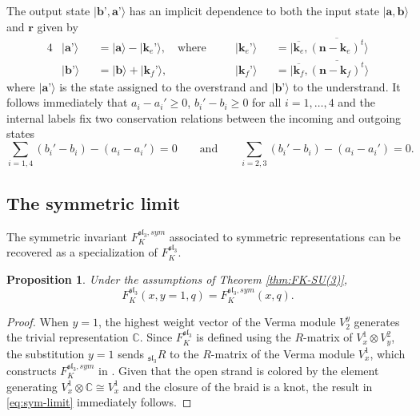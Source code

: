 \documentclass[12pt,oneside,reqno]{amsart}
\def\C{\mathbb{C}}
\newtheorem{proposicion}{\bf Proposition}
\numberwithin{teorema}{section}
\numberwithin{definicion}{section}
\numberwithin{lema}{section}
\numberwithin{conjetura}{section}
\numberwithin{proposicion}{section}
\def\sl{\mathfrak{sl}}
\begin{document}
The output state $|\textbf{b'},\textbf{a'}\rangle$ has an implicit dependence to both the input state $|\textbf{a},\textbf{b}\rangle$ and $\textbf{r}$ given by
\begin{alignat}{4}\label{eq:output-input-1}
    &|\textbf{a'}\rangle &&= |\textbf{a}\rangle - |\textbf{k}_e\textbf{'}\rangle, \hspace{1em} \text{where} \hspace{1em} &&|\textbf{k}_e\textbf{'}\rangle &&= |\overline{\textbf{k}_e},\overline{(\textbf{n}-\textbf{k}_e)^t}\rangle \\ \label{eq:output-input-2}
    &|\textbf{b'}\rangle &&= |\textbf{b}\rangle + |\textbf{k}_f\textbf{'}\rangle, \hspace{2em} &&|\textbf{k}_f\textbf{'}\rangle &&= |\overline{\textbf{k}_f},\overline{(\textbf{n}-\textbf{k}_f)^t}\rangle
\end{alignat}
where $|\textbf{a'}\rangle$ is the state assigned to the overstrand and $|\textbf{b'}\rangle$ to the understrand. It follows immediately that $a_i-a_i'\geq 0$, $b_i'-b_i\geq 0$ for all $i=1,\dots,4$ and the internal labels fix two conservation relations between the incoming and outgoing states
\begin{equation}\label{eq:conservation-rels}
    \sum_{i=1,4} (b_i'-b_i)-(a_i-a_i')=0 \qquad \text{and} \qquad \sum_{i=2,3} (b_i'-b_i)-(a_i-a_i')=0.
\end{equation}

\subsection{The symmetric limit}\label{sec:symmetric-limit}

The symmetric invariant $F_K^{\sl_3,sym}$ associated to symmetric representations \cite{EGGKPS, gruen22, Park20} can be recovered as a specialization of $F_K^{\sl_3}$.

\begin{proposicion} Under the assumptions of Theorem \ref{thm:FK-SU(3)},
\begin{equation}\label{eq:sym-limit}
         F_K^{\sl_3}(x,y=1,q)=F_K^{\sl_3,sym}(x,q).
\end{equation}
\end{proposicion}

\begin{proof} When $y=1$, the highest weight vector of the Verma module $V^y_2$ generates the trivial representation $\C$. Since $F_K^{\sl_3}$ is defined using the $R$-matrix of $V_x^1\otimes V_y^2$, the substitution $y=1$ sends ${}_{\sl_3}R$ to the $R$-matrix of the Verma module $V_x^1$, which constructs $F_K^{\sl_3,sym}$ in \cite{gruen22}. Given that the open strand is colored by the element generating $V_x^1\otimes \C \cong V_x^1$ and the closure of the braid is a knot, the result in \eqref{eq:sym-limit} immediately follows.
\end{proof}
\end{document}
